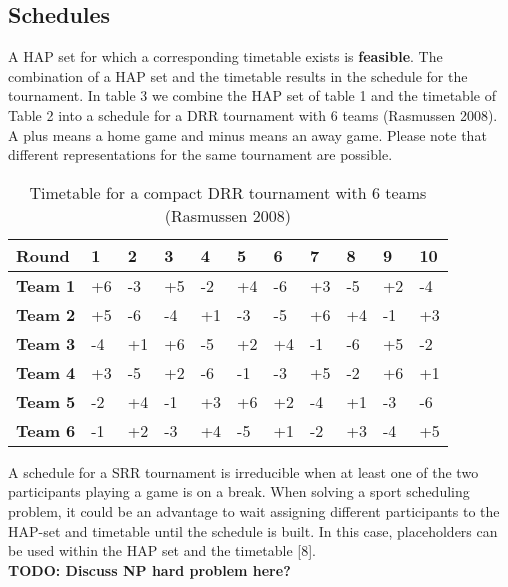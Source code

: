 \subsection{Schedules}
A HAP set for which a corresponding timetable exists is \textbf{feasible}. The combination of a HAP set and the timetable results in the schedule for the tournament. In table 3 we combine the HAP set of table 1 and the timetable of Table 2 into a schedule for a DRR tournament with 6 teams (Rasmussen 2008). A plus means a home game and minus means an away game. Please note that different representations for the same tournament are possible. \\

\begin{table}[!h]
\centering
\begin{tabular}{|l|l|l|l|l|l|l|l|l|l|l|}
\hline
\textbf{Round}  & \textbf{1} & \textbf{2} & \textbf{3} & \textbf{4} & \textbf{5} & \textbf{6} & \textbf{7} & \textbf{8} & \textbf{9} & \textbf{10} \\ \hline
\textbf{Team 1} & +6         & -3         & +5         & -2         & +4         & -6         & +3         & -5         & +2         & -4          \\ \hline
\textbf{Team 2} & +5         & -6         & -4         & +1         & -3         & -5         & +6         & +4         & -1         & +3          \\ \hline
\textbf{Team 3} & -4         & +1         & +6         & -5         & +2         & +4         & -1         & -6         & +5         & -2          \\ \hline
\textbf{Team 4} & +3         & -5         & +2         & -6         & -1         & -3         & +5         & -2         & +6         & +1          \\ \hline
\textbf{Team 5} & -2         & +4         & -1         & +3         & +6         & +2         & -4         & +1         & -3         & -6          \\ \hline
\textbf{Team 6} & -1         & +2         & -3         & +4         & -5         & +1         & -2         & +3         & -4         & +5          \\ \hline
\end{tabular}
\caption{Timetable for a compact DRR tournament with 6 teams (Rasmussen 2008)}
\label{tbl3}
\end{table}

A schedule for a SRR tournament is irreducible when at least one of the two participants playing a game is on a break. When solving a sport scheduling problem, it could be an advantage to wait assigning different participants to the HAP-set and timetable until the schedule is built. In this case,  placeholders can be used within the HAP set and the timetable [8].
\\[5px]
\textbf{TODO: Discuss NP hard problem here?}
